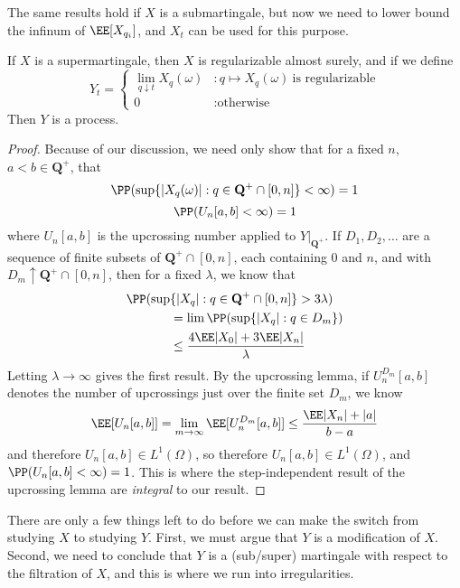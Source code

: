 The same results hold if $X$ is a submartingale, but now we need to lower bound the infinum of $\EE[X_{q_i}]$, and $X_t$ can be used for this purpose.

\begin{theorem}
    If $X$ is a supermartingale, then $X$ is regularizable almost surely, and if we define
    \[ Y_t = \begin{cases} \lim_{q \downarrow t} X_q(\omega) & : q \mapsto X_q(\omega)\ \text{is regularizable} \\ 0 & : \text{otherwise} \end{cases} \]
    Then $Y$ is a \cadlag process.
\end{theorem}
\begin{proof}
    Because of our discussion, we need only show that for a fixed $n$, $a < b \in \mathbf{Q}^+$, that
    \[ \PP(\sup \{ |X_q(\omega)|: q \in \mathbf{Q}^+ \cap [0,n] \} < \infty) = 1 \]
    \[ \PP(U_n[a,b] < \infty) = 1 \]
    where $U_n[a,b]$ is the upcrossing number applied to $Y|_{\mathbf{Q}^+}$. If $D_1, D_2, \dots$ are a sequence of finite subsets of $\mathbf{Q}^+ \cap [0,n]$, each containing $0$ and $n$, and with $D_m \uparrow \mathbf{Q}^+ \cap [0,n]$, then for a fixed $\lambda$, we know that
    \begin{align*}
        \PP(\sup & \{ |X_q|: q \in \mathbf{Q}^+ \cap [0,n] \} > 3 \lambda)\\
        &= \lim \PP(\sup \{ |X_q|: q \in D_m \})\\
        &\leq \frac{4 \EE |X_0| + 3 \EE |X_n|}{\lambda}
    \end{align*}
    Letting $\lambda \to \infty$ gives the first result. By the upcrossing lemma, if $U^{D_m}_n[a,b]$ denotes the number of upcrossings just over the finite set $D_m$, we know
    \[ \EE[U_n[a,b]] = \lim_{m \to \infty} \EE[U^{D_m}_n[a,b]] \leq \frac{\EE |X_n| + |a|}{b-a} \]
    and therefore $U_n[a,b] \in L^1(\Omega)$, so therefore $U_n[a,b] \in L^1(\Omega)$, and $\PP(U_n[a,b] < \infty) = 1$. This is where the step-independent result of the upcrossing lemma are {\it integral} to our result.
\end{proof}

There are only a few things left to do before we can make the switch from studying $X$ to studying $Y$. First, we must argue that $Y$ is a modification of $X$. Second, we need to conclude that $Y$ is a (sub/super) martingale with respect to the filtration of $X$, and this is where we run into irregularities.

